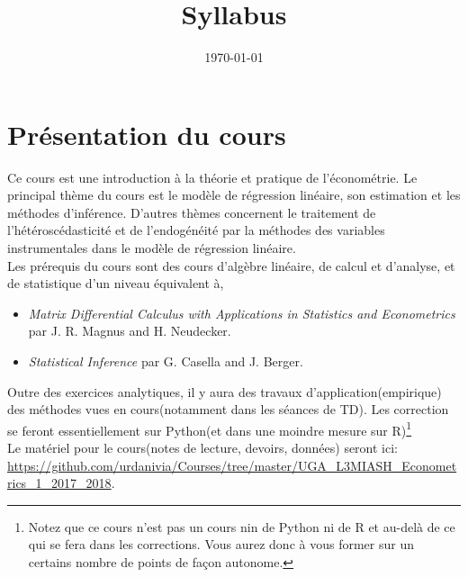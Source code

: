 
\title{Syllabus}
\date{\today}

\maketitle
\section*{ Présentation du cours}
Ce cours est une introduction  à la théorie et pratique de l'économétrie. Le principal thème du cours est le modèle de régression linéaire, son estimation et les méthodes d'inférence. D'autres thèmes concernent le traitement de l'hétéroscédasticité et de l'endogénéité par la méthodes des variables instrumentales dans le modèle de régression linéaire.\\
Les prérequis du cours sont  des cours d'algèbre linéaire, de calcul et d'analyse, et de statistique d'un niveau équivalent à,
\begin{itemize}
\item \emph{Matrix Differential Calculus with Applications in Statistics and Econometrics} par J. R. Magnus and H. Neudecker.
\item \emph{Statistical Inference} par  G. Casella and J. Berger.
\end{itemize}
Outre des exercices analytiques, il y aura des travaux d'application(empirique) des méthodes vues en cours(notamment dans les séances de TD). Les correction se feront essentiellement sur Python(et dans une moindre mesure sur R)\footnote{Notez que ce cours n'est pas un cours nin de Python ni de R et au-delà de ce qui se fera dans les corrections. Vous aurez donc à vous former sur un certains nombre de points de façon autonome.}\\
Le matériel pour le cours(notes de lecture, devoirs, données) seront ici:
\url{https://github.com/urdanivia/Courses/tree/master/UGA_L3MIASH_Econometrics_1_2017_2018}.


